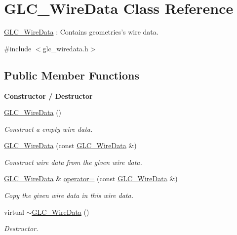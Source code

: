 \hypertarget{class_g_l_c___wire_data}{\section{G\-L\-C\-\_\-\-Wire\-Data Class Reference}
\label{class_g_l_c___wire_data}
}


\hyperlink{class_g_l_c___wire_data}{G\-L\-C\-\_\-\-Wire\-Data} \-: Contains geometries's wire data.  




{\ttfamily \#include $<$glc\-\_\-wiredata.\-h$>$}

\subsection*{Public Member Functions}
\begin{Indent}{\bf Constructor / Destructor}\par
\begin{DoxyCompactItemize}
\item 
\hyperlink{class_g_l_c___wire_data_ab9c73e5a595678d51fb7c395b8d6d5d6}{G\-L\-C\-\_\-\-Wire\-Data} ()
\begin{DoxyCompactList}\small\item\em Construct a empty wire data. \end{DoxyCompactList}\item 
\hyperlink{class_g_l_c___wire_data_a4d94c2b0150cdf99f4055c33c97ab83e}{G\-L\-C\-\_\-\-Wire\-Data} (const \hyperlink{class_g_l_c___wire_data}{G\-L\-C\-\_\-\-Wire\-Data} \&)
\begin{DoxyCompactList}\small\item\em Construct wire data from the given wire data. \end{DoxyCompactList}\item 
\hyperlink{class_g_l_c___wire_data}{G\-L\-C\-\_\-\-Wire\-Data} \& \hyperlink{class_g_l_c___wire_data_a1de74fcf6daca38228fb0cb62e7207b0}{operator=} (const \hyperlink{class_g_l_c___wire_data}{G\-L\-C\-\_\-\-Wire\-Data} \&)
\begin{DoxyCompactList}\small\item\em Copy the given wire data in this wire data. \end{DoxyCompactList}\item 
virtual \hyperlink{class_g_l_c___wire_data_ac85696894eea27db677d76a4a9008267}{$\sim$\-G\-L\-C\-\_\-\-Wire\-Data} ()
\begin{DoxyCompactList}\small\item\em Destructor. \end{DoxyCompactList}\end{DoxyCompactItemize}
\end{Indent}
